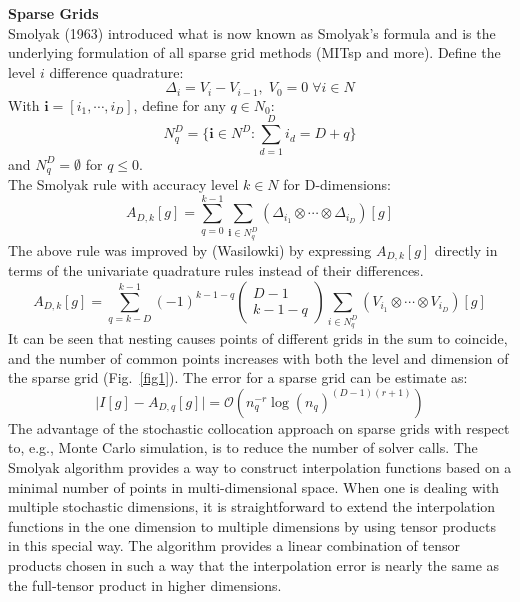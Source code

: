 \documentclass{article}
\begin{document}
 \textbf{Sparse Grids}\\
 Smolyak (1963) introduced what is now known as Smolyak's formula and is the underlying formulation
 of all sparse grid methods (MITsp and more). Define the level $i$ difference quadrature:
 \begin{equation}
\Delta_i = V_i - V_{i-1},  \; V_0 = 0 \; \forall i \in N
\end{equation}
With $\textbf{i} = [i_1, \cdots, i_D]$, define for any $q \in N_0$:
 \begin{equation}
N_q^D = \lbrace \textbf{i} \in N^D : \sum_{d=1}^{D} i_d=D + q \rbrace 
\end{equation}
and $N_{q}^D = \emptyset$ for $q \le 0$. \\
 The Smolyak rule with accuracy level $k \in N$ for D-dimensions:
 \begin{equation}
A_{D,k}[g] = \sum_{q=0}^{k-1}\sum_{\textbf{i}\in N_{q}^D} (\Delta_{i_1} \otimes \cdots \otimes \Delta_{i_D})[g]
\end{equation}
The above rule was improved by (Wasilowki) by expressing $A_{D,k}[g]$ directly
in terms of the univariate quadrature rules instead of their differences.
\begin{equation}
A_{D,k}[g] = \sum_{q=k-D}^{k-1}(-1)^{k-1-q}\begin{pmatrix}D-1 \\ k-1-q \end{pmatrix}
\sum_{i \in N_q^D}(V_{i_1} \otimes \cdots \otimes V_{i_D})[g]
\end{equation}
 It can be seen that nesting causes points of different grids in the sum to coincide, and the number of
 common points increases with both the level and dimension of the sparse grid (Fig.~\ref{fig1}).
 The error for a sparse grid can be estimate as:
 \begin{equation}
\lvert I[g] -A_{D,q}[g] \rvert = \mathcal{O}(n_{q}^{-r}\log(n_q)^{(D-1)(r+1)})
\end{equation}
 The advantage of the stochastic collocation approach on sparse grids with respect to, e.g., Monte Carlo 
 simulation, is to reduce the number of solver calls.
 The Smolyak algorithm provides a way to construct interpolation functions based on a minimal number
 of points in multi-dimensional space. When one is dealing with multiple stochastic dimensions, it is 
 straightforward to extend the interpolation functions in the one dimension to multiple dimensions by 
 using tensor products in this special way. The algorithm 
 provides a linear combination of tensor products chosen in such a way that the interpolation error is 
 nearly the same as the full-tensor product in higher dimensions. 
\end{document}
